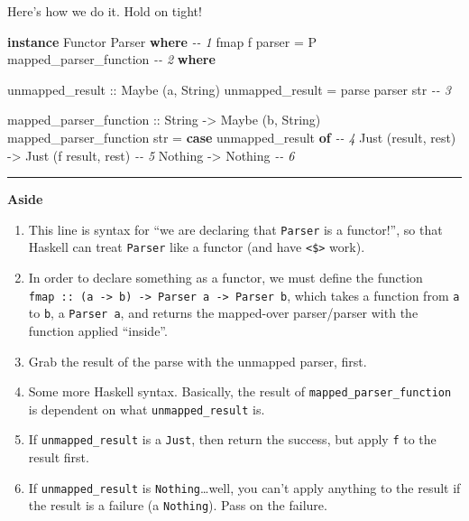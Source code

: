 \documentclass[]{article}
\newenvironment{Shaded}{}{}
\newcommand{\CommentTok}[1]{\textcolor[rgb]{0.38,0.63,0.69}{\textit{#1}}}
\newcommand{\DataTypeTok}[1]{\textcolor[rgb]{0.56,0.13,0.00}{#1}}
\newcommand{\FunctionTok}[1]{\textcolor[rgb]{0.02,0.16,0.49}{#1}}
\newcommand{\KeywordTok}[1]{\textcolor[rgb]{0.00,0.44,0.13}{\textbf{#1}}}
\newcommand{\NormalTok}[1]{#1}
\newcommand{\OtherTok}[1]{\textcolor[rgb]{0.00,0.44,0.13}{#1}}
\begin{document}
Here's how we do it. Hold on tight!

\begin{Shaded}
\begin{Highlighting}[]
\KeywordTok{instance} \DataTypeTok{Functor} \DataTypeTok{Parser} \KeywordTok{where}                                       \CommentTok{{-}{-} 1}
    \FunctionTok{fmap}\NormalTok{ f parser }\OtherTok{=} \DataTypeTok{P}\NormalTok{ mapped\_parser\_function                        }\CommentTok{{-}{-} 2}
        \KeywordTok{where}

\OtherTok{            unmapped\_result ::} \DataTypeTok{Maybe}\NormalTok{ (a, }\DataTypeTok{String}\NormalTok{)}
\NormalTok{            unmapped\_result }\OtherTok{=}\NormalTok{ parse parser str                      }\CommentTok{{-}{-} 3}

\OtherTok{            mapped\_parser\_function ::} \DataTypeTok{String} \OtherTok{{-}>} \DataTypeTok{Maybe}\NormalTok{ (b, }\DataTypeTok{String}\NormalTok{)}
\NormalTok{            mapped\_parser\_function str }\OtherTok{=}
                \KeywordTok{case}\NormalTok{ unmapped\_result }\KeywordTok{of}                             \CommentTok{{-}{-} 4}
                    \DataTypeTok{Just}\NormalTok{ (result, rest) }\OtherTok{{-}>} \DataTypeTok{Just}\NormalTok{ (f result, rest)    }\CommentTok{{-}{-} 5}
                    \DataTypeTok{Nothing}             \OtherTok{{-}>} \DataTypeTok{Nothing}                  \CommentTok{{-}{-} 6}
\end{Highlighting}
\end{Shaded}

\begin{center}\rule{0.5\linewidth}{\linethickness}\end{center}

\textbf{Aside}

\begin{enumerate}
\def\labelenumi{\arabic{enumi}.}
\tightlist
\item
  This line is syntax for ``we are declaring that \texttt{Parser} is a
  functor!'', so that Haskell can treat \texttt{Parser} like a functor (and have
  \texttt{\textless{}\$\textgreater{}} work).
\item
  In order to declare something as a functor, we must define the function
  \texttt{fmap\ ::\ (a\ -\textgreater{}\ b)\ -\textgreater{}\ Parser\ a\ -\textgreater{}\ Parser\ b},
  which takes a function from \texttt{a} to \texttt{b}, a \texttt{Parser\ a},
  and returns the mapped-over parser/parser with the function applied
  ``inside''.
\item
  Grab the result of the parse with the unmapped parser, first.
\item
  Some more Haskell syntax. Basically, the result of
  \texttt{mapped\_parser\_function} is dependent on what
  \texttt{unmapped\_result} is.
\item
  If \texttt{unmapped\_result} is a \texttt{Just}, then return the success, but
  apply \texttt{f} to the result first.
\item
  If \texttt{unmapped\_result} is \texttt{Nothing}\ldots well, you can't apply
  anything to the result if the result is a failure (a \texttt{Nothing}). Pass
  on the failure.
\end{enumerate}
\end{document}

